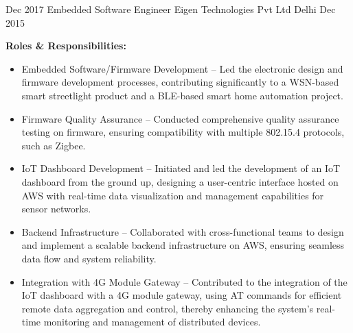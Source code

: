 \begin{experiences}
  \experience
  {Dec 2017}   %
  {Embedded Software Engineer}  %
  {Eigen Technologies Pvt Ltd}  %
  {Delhi}  %
  {Dec 2015}  %
  {   %
      \textbf{Roles \& Responsibilities:}
      \begin{itemize}
          \item Embedded Software/Firmware Development – Led the electronic design and firmware development processes, contributing significantly to a WSN-based smart streetlight product and a BLE-based smart home automation project.
          \item Firmware Quality Assurance – Conducted comprehensive quality assurance testing on firmware, ensuring compatibility with multiple 802.15.4 protocols, such as Zigbee.
          \item IoT Dashboard Development – Initiated and led the development of an IoT dashboard from the ground up, designing a user-centric interface hosted on AWS with real-time data visualization and management capabilities for sensor networks.
          \item Backend Infrastructure – Collaborated with cross-functional teams to design and implement a scalable backend infrastructure on AWS, ensuring seamless data flow and system reliability.
          \item Integration with 4G Module Gateway – Contributed to the integration of the IoT dashboard with a 4G module gateway, using AT commands for efficient remote data aggregation and control, thereby enhancing the system's real-time monitoring and management of distributed devices.
      \end{itemize}    
  }
  {}  %


    
\end{experiences}